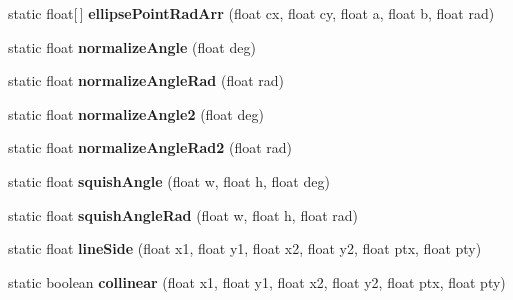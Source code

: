 \begin{DoxyCompactItemize}
\item 
\hypertarget{classhype_1_1util_1_1_h_math_a0ed7dff059ec1f5e67ed231e715f030d}{static float\mbox{[}$\,$\mbox{]} {\bfseries ellipse\-Point\-Rad\-Arr} (float cx, float cy, float a, float b, float rad)}\label{classhype_1_1util_1_1_h_math_a0ed7dff059ec1f5e67ed231e715f030d}

\item 
\hypertarget{classhype_1_1util_1_1_h_math_aa641b5124a8cc29ff96c589a3add2135}{static float {\bfseries normalize\-Angle} (float deg)}\label{classhype_1_1util_1_1_h_math_aa641b5124a8cc29ff96c589a3add2135}

\item 
\hypertarget{classhype_1_1util_1_1_h_math_ae4d6fb62a48211c091adad7ef17b17ac}{static float {\bfseries normalize\-Angle\-Rad} (float rad)}\label{classhype_1_1util_1_1_h_math_ae4d6fb62a48211c091adad7ef17b17ac}

\item 
\hypertarget{classhype_1_1util_1_1_h_math_a81ea5767bc6ed1234e6e625225464a12}{static float {\bfseries normalize\-Angle2} (float deg)}\label{classhype_1_1util_1_1_h_math_a81ea5767bc6ed1234e6e625225464a12}

\item 
\hypertarget{classhype_1_1util_1_1_h_math_aeca5cf9d68d98d9e482f14898ad45f28}{static float {\bfseries normalize\-Angle\-Rad2} (float rad)}\label{classhype_1_1util_1_1_h_math_aeca5cf9d68d98d9e482f14898ad45f28}

\item 
\hypertarget{classhype_1_1util_1_1_h_math_ad24eeeb91cf12760e49edd64b389bf9a}{static float {\bfseries squish\-Angle} (float w, float h, float deg)}\label{classhype_1_1util_1_1_h_math_ad24eeeb91cf12760e49edd64b389bf9a}

\item 
\hypertarget{classhype_1_1util_1_1_h_math_aa290e50e2e3d2d1a3d1db765e64b213c}{static float {\bfseries squish\-Angle\-Rad} (float w, float h, float rad)}\label{classhype_1_1util_1_1_h_math_aa290e50e2e3d2d1a3d1db765e64b213c}

\item 
\hypertarget{classhype_1_1util_1_1_h_math_a8f87a7884529c76809f9b0b745a9954a}{static float {\bfseries line\-Side} (float x1, float y1, float x2, float y2, float ptx, float pty)}\label{classhype_1_1util_1_1_h_math_a8f87a7884529c76809f9b0b745a9954a}

\item 
\hypertarget{classhype_1_1util_1_1_h_math_aefc2b344f16a16f3ee4661db27e1c280}{static boolean {\bfseries collinear} (float x1, float y1, float x2, float y2, float ptx, float pty)}\label{classhype_1_1util_1_1_h_math_aefc2b344f16a16f3ee4661db27e1c280}


\end{DoxyCompactItemize}
